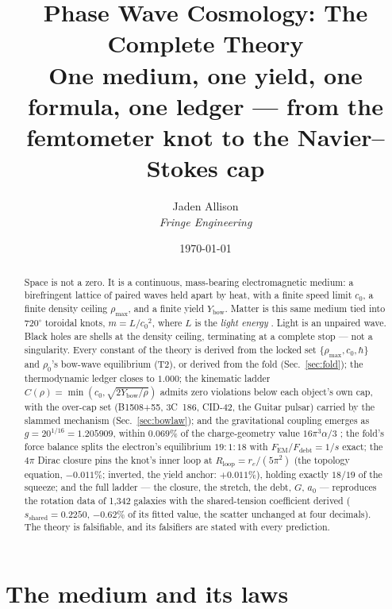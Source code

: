 \documentclass[11pt, a4paper]{article}
\title{\bf Phase Wave Cosmology: The Complete Theory\\[4pt]
\large One medium, one yield, one formula, one ledger --- from the femtometer knot to the Navier--Stokes cap}
\author{Jaden Allison \\ \textit{Fringe Engineering}}
\date{\today}
\newcommand{\cnot}{\ensuremath{c_0}}
\newcommand{\rhonot}{\ensuremath{\rho_0}}
\newcommand{\rhomax}{\ensuremath{\rho_{\mathrm{max}}}}
\newcommand{\Ybow}{\ensuremath{Y_{\mathrm{bow}}}}
\begin{document}
\maketitle

\begin{abstract}
Space is not a zero. It is a continuous, mass-bearing electromagnetic medium: a
birefringent lattice of paired waves held apart by heat, with a finite speed limit
$\cnot$, a finite density ceiling $\rhomax$, and a finite yield $\Ybow$. Matter is
this same medium tied into $720^\circ$ toroidal knots, $m = L/\cnot^2$, where $L$
is the \emph{light energy} \cite{einstein1905}. Light is an unpaired wave.
Black holes are shells at the density ceiling, terminating at a complete stop ---
not a singularity. Every constant of the theory is derived from the locked set
$\{\rhomax,\cnot,\hbar\}$ and $\rhonot$'s bow-wave equilibrium (T2), or derived
from the fold (Sec.~\ref{sec:fold}); the thermodynamic ledger closes to $1.000$;
the kinematic ladder $C(\rho) = \min(\cnot,\sqrt{2\Ybow/\rho})$ admits zero
violations below each object's own cap, with the over-cap set (B1508+55,
3C~186, CID-42, the Guitar pulsar) carried by the slammed mechanism
(Sec.~\ref{sec:bowlaw}); and the gravitational coupling emerges as
$g = 20^{1/16} = 1.205909$, within $0.069\%$ of the charge-geometry value
$16\pi^3\alpha/3$ \cite{williamson1997,lai2026}; the fold's force balance splits
the electron's equilibrium $19:1:18$ with $F_{\mathrm{EM}}/F_{\mathrm{debt}} =
1/s$ exact; the $4\pi$ Dirac closure pins the knot's inner loop at
$R_{\mathrm{loop}} = r_e/(5\pi^2)$ (the topology equation, $-0.011\%$; inverted,
the yield anchor: $+0.011\%$), holding exactly $18/19$ of the squeeze; and the
full ladder --- the closure, the stretch, the debt, $G$, $a_0$ --- reproduces
the rotation data of 1,342 galaxies with the shared-tension coefficient derived
($s_{\mathrm{shared}} = 0.2250$, $-0.62\%$ of its fitted value, the scatter
unchanged at four decimals). The theory is falsifiable, and its falsifiers are
stated with every prediction.
\end{abstract}

\tableofcontents

\section{The medium and its laws}
\label{sec:ontology}
\end{document}
